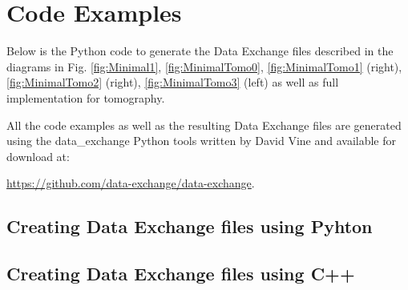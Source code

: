 \section{Code Examples}


Below is the Python code to generate the Data Exchange files described in the diagrams in Fig.  \ref{fig:Minimal1}, \ref{fig:MinimalTomo0}, \ref{fig:MinimalTomo1} (right), \ref{fig:MinimalTomo2} (right), \ref{fig:MinimalTomo3} (left) as well as full implementation for tomography.


All the code examples as well as the resulting Data Exchange files are generated using the data\_exchange Python tools written by David Vine and available for download at: 

 \url{https://github.com/data-exchange/data-exchange}.

\hypersetup{linkcolor = white}
 
\newpage
\subsection{Creating Data Exchange files using Pyhton}




\newpage
{}


\newpage
{}


\newpage
{}


\newpage
{}


\newpage
{}


\newpage
{}


\hypersetup{linkcolor = softBlue}

\subsection{Creating Data Exchange files using C++}
